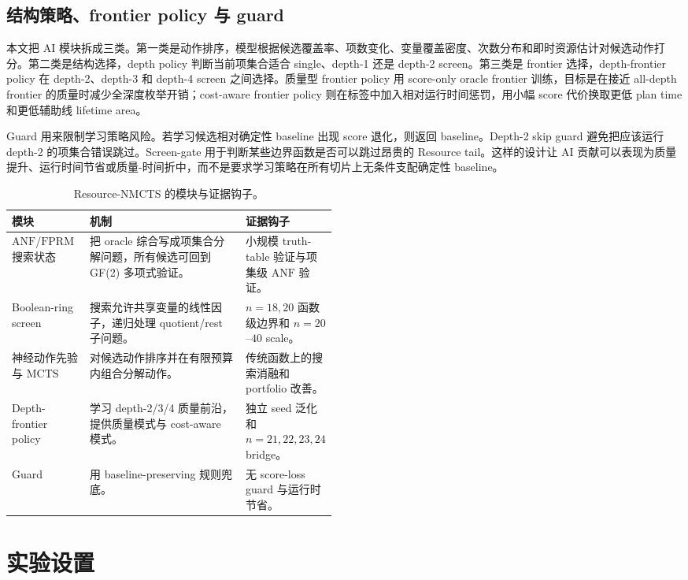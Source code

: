 \documentclass[UTF8,fontset=macnew,11pt]{ctexart}
\newcommand{\method}{Resource-NMCTS}
\newcommand{\anf}{\ensuremath{\mathrm{ANF}}}
\newcommand{\fprm}{\ensuremath{\mathrm{FPRM}}}
\newcommand{\mcts}{\ensuremath{\mathrm{MCTS}}}
\newcommand{\ttable}{truth-table}
\begin{document}
\subsection{结构策略、frontier policy 与 guard}

本文把 AI 模块拆成三类。第一类是动作排序，模型根据候选覆盖率、项数变化、变量覆盖密度、次数分布和即时资源估计对候选动作打分。第二类是结构选择，depth policy 判断当前项集合适合 single、depth-1 还是 depth-2 screen。第三类是 frontier 选择，depth-frontier policy 在 depth-2、depth-3 和 depth-4 screen 之间选择。质量型 frontier policy 用 score-only oracle frontier 训练，目标是在接近 all-depth frontier 的质量时减少全深度枚举开销；cost-aware frontier policy 则在标签中加入相对运行时间惩罚，用小幅 score 代价换取更低 plan time 和更低辅助线 lifetime area。

Guard 用来限制学习策略风险。若学习候选相对确定性 baseline 出现 score 退化，则返回 baseline。Depth-2 skip guard 避免把应该运行 depth-2 的项集合错误跳过。Screen-gate 用于判断某些边界函数是否可以跳过昂贵的 Resource tail。这样的设计让 AI 贡献可以表现为质量提升、运行时间节省或质量-时间折中，而不是要求学习策略在所有切片上无条件支配确定性 baseline。

\begin{table}[H]
\centering
\small
\caption{\method{} 的模块与证据钩子。}
\label{tab:modules}
\begin{tabularx}{\linewidth}{>{\raggedright\arraybackslash}p{0.24\linewidth}>{\raggedright\arraybackslash}X>{\raggedright\arraybackslash}p{0.24\linewidth}}
\toprule
模块 & 机制 & 证据钩子 \\
\midrule
\anf{}/\fprm{} 搜索状态 & 把 oracle 综合写成项集合分解问题，所有候选可回到 GF(2) 多项式验证。 & 小规模 \ttable{} 验证与项集级 \anf{} 验证。 \\
Boolean-ring screen & 搜索允许共享变量的线性因子，递归处理 quotient/rest 子问题。 & $n=18,20$ 函数级边界和 $n=20$--$40$ scale。 \\
神经动作先验与 \mcts{} & 对候选动作排序并在有限预算内组合分解动作。 & 传统函数上的搜索消融和 portfolio 改善。 \\
Depth-frontier policy & 学习 depth-2/3/4 质量前沿，提供质量模式与 cost-aware 模式。 & 独立 seed 泛化和 $n=21,22,23,24$ bridge。 \\
Guard & 用 baseline-preserving 规则兜底。 & 无 score-loss guard 与运行时节省。 \\
\bottomrule
\end{tabularx}
\end{table}

\section{实验设置}
\end{document}
